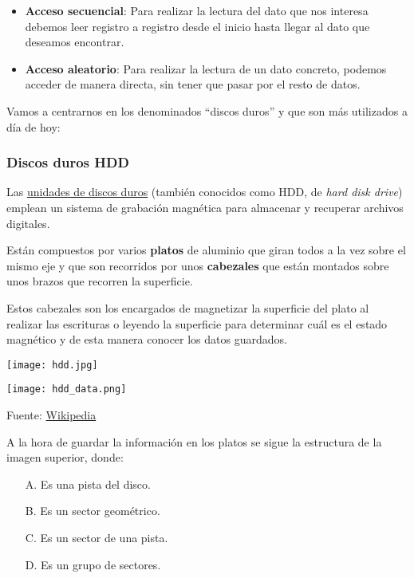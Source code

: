\begin{itemize}
    \item \textbf{Acceso secuencial}: Para realizar la lectura del dato que nos interesa debemos leer registro a registro desde el inicio hasta llegar al dato que deseamos encontrar.

    \item \textbf{Acceso aleatorio}: Para realizar la lectura de un dato concreto, podemos acceder de manera directa, sin tener que pasar por el resto de datos.
\end{itemize}

Vamos a centrarnos en los denominados “discos duros” y que son  más utilizados a día de hoy:

\subsubsection{Discos duros HDD}

Las \href{https://es.wikipedia.org/wiki/Unidad_de_disco_duro}{unidades de discos duros} (también conocidos como HDD, de \textit{hard disk drive}) emplean un sistema de grabación magnética para almacenar y recuperar archivos digitales.

Están compuestos por varios \textbf{platos} de aluminio que giran todos a la vez sobre el mismo eje y que son recorridos por unos \textbf{cabezales} que están montados sobre unos brazos que recorren la superficie.

Estos cabezales son los encargados de magnetizar la superficie del plato al realizar las escrituras o leyendo la superficie para determinar cuál es el estado magnético y de esta manera conocer los datos guardados.

{
\begin{minipage}{0.57\linewidth}
        \texttt{[image: hdd.jpg]}
\end{minipage}
\hfill
\begin{minipage}{0.42\linewidth}
    \texttt{[image: hdd\_data.png]}
\end{minipage}
\vspace{-35pt}
\begin{center}
  {\footnotesize Fuente:  \href{https://es.wikipedia.org/wiki/Unidad_de_disco_duro}{Wikipedia}}
\end{center}
}

A la hora de guardar la información en los platos se sigue la estructura de la imagen superior, donde:

\begin{enumerate}
    \item[A.] Es una pista del disco.
    \item[B.] Es un sector geométrico.
    \item[C.] Es un sector de una pista.
    \item[D.] Es un grupo de sectores.
\end{enumerate}

